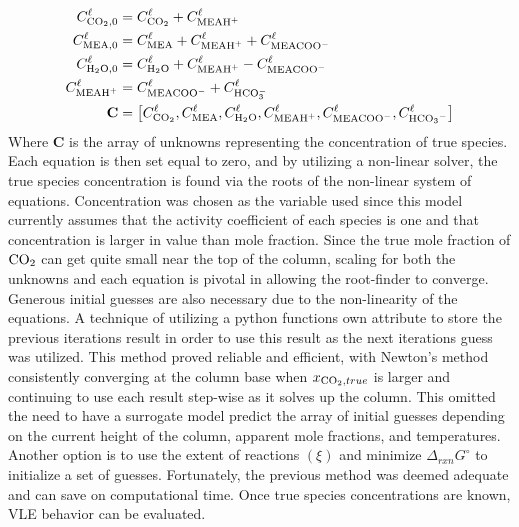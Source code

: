 \documentclass[a4paper,fleqn]{cas-sc}
\newcommand{\COtwo}{{\ce{CO2}}}
\newcommand{\HtwoO}{{\ce{H2O}}}
\newcommand{\MEA}{{\ce{MEA}}}
\newcommand{\MEAH}{\ce{MEAH+}}
\newcommand{\MEACOO}{{\ce{MEACOO-}}}
\newcommand{\HCOthree}{{\ce{HCO3-}}}
\newcommand{\liq}{\ell}
\begin{document}
    \begin{align}
        C^{\liq}_{\ce{CO2},0} &= C^{\liq}_{\ce{CO2}} + C^{\liq}_{\ce{MEAH}^{+}} \\
        C^{\liq}_{\ce{MEA},0} &= C^{\liq}_{\ce{MEA}} + C^{\liq}_{\ce{MEAH}^{+}} + C^{\liq}_{\ce{MEACOO}^{-}} \\
        C^{\liq}_{\ce{H2O},0} &= C^{\liq}_{\ce{H2O}} + C^{\liq}_{\ce{MEAH}^{+}} - C^{\liq}_{\ce{MEACOO}^{-}} \\
        C^{\liq}_{\ce{MEAH}^{+}} &= C^{\liq}_{\ce{MEACOO}^{-}} + C^{\liq}_{\ce{HCO3}^{-}} \\
        \textbf{C} &= \left[
                          C^{\liq}_{\COtwo}, C^{\liq}_{\MEA}, C^{\liq}_{\HtwoO}, C^{\liq}_{\MEAH}, C^{\liq}_{\MEACOO}, C^{\liq}_{\HCOthree}\right]
    \end{align}
    Where $\textbf{C}$ is the array of unknowns representing the concentration of true species.
    Each equation is then set equal to zero, and by utilizing a non-linear solver, the true species concentration is found via the roots of the non-linear system of equations. Concentration was chosen as the variable used since this model currently assumes that the activity coefficient of each species is one and that concentration is larger in value than mole fraction. Since the true mole fraction of $\COtwo$ can get quite small near the top of the column, scaling for both the unknowns and each equation is pivotal in allowing the root-finder to converge. Generous initial guesses are also necessary due to the non-linearity of the equations. A technique of utilizing a python functions own attribute to store the previous iterations result in order to use this result as the next iterations guess was utilized. This method proved reliable and efficient, with Newton’s method consistently converging at the column base when $x_{\COtwo, true}$ is larger and continuing to use each result step-wise as it solves up the column. This omitted the need to have a surrogate model predict the array of initial guesses depending on the current height of the column, apparent mole fractions, and temperatures. Another option is to use the extent of reactions $(\xi)$ and minimize $\Delta _{rxn} G^{\circ}$ to initialize a set of guesses. Fortunately, the previous method was deemed adequate and can save on computational time. Once true species concentrations are known, VLE behavior can be evaluated.
\end{document}
